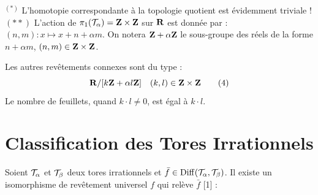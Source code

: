 \documentclass[10pt]{amsart}
\renewcommand{\Torus}{\cT}
\begin{document}
  \noindent $^{(*)}$ L'homotopie correspondante à la topologie quotient est évidemment triviale ! \\
  \noindent $(**)$ L'action de $\FundamentalGroup(\Torus_{\alpha}) = \ringZ \times \ringZ$ sur ${\mathbf{R}}$ est donnée par :
  $(n, m) : x \longmapsto x + n + \alpha m$.
  On notera ${\mathbf{Z}} + \alpha {\mathbf{Z}}$ le sous-groupe des réels de la forme $n + \alpha m$,
  $(n, m) \in {\mathbf{Z}} \times {\mathbf{Z}}$.
  
  Les autres revêtements connexes sont du type :
  \begin{equation}
    {\mathbf{R}} / [k {\mathbf{Z}} + \alpha l {\mathbf{Z}}] \quad (k, l) \in {\mathbf{Z}} \times {\mathbf{Z}} \tag{4}
  \end{equation}
  Le nombre de feuillets,
  quand $k \cdot l \neq 0$,
  est égal à $k \cdot l$.
  
  \section*{Classification des Tores Irrationnels}
  Soient $\Torus_{\alpha}$ et $\Torus_{\beta}$ deux tores irrationnels et $\bar{f} \in \Diff(\Torus_{\alpha}, \Torus_{\beta})$.
  Il existe un isomorphisme de revêtement universel $f$ qui relève $\bar{f}$ [1] :
  
  \begin{center}
  \end{center}
  
\end{document}
